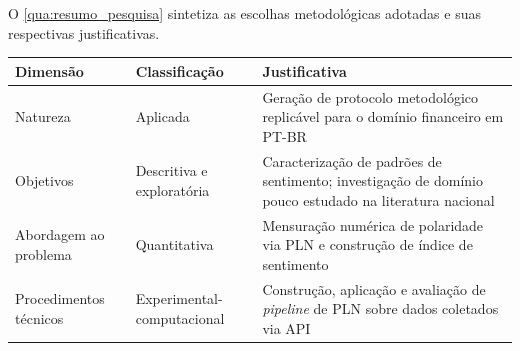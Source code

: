 O \autoref{qua:resumo_pesquisa} sintetiza as escolhas metodológicas adotadas e suas respectivas justificativas.

\begin{quadro}[htb]
	\caption{\label{qua:resumo_pesquisa}Síntese da caracterização metodológica da pesquisa}
	\begin{tabular}{|p{4cm}|p{4cm}|p{6.5cm}|}
		\hline
		\textbf{Dimensão} & \textbf{Classificação} & \textbf{Justificativa} \\
		\hline
		Natureza & Aplicada & Geração de protocolo metodológico replicável para o domínio financeiro em PT-BR \\
		\hline
		Objetivos & Descritiva e exploratória & Caracterização de padrões de sentimento; investigação de domínio pouco estudado na literatura nacional \\
		\hline
		Abordagem ao problema & Quantitativa & Mensuração numérica de polaridade via PLN e construção de índice de sentimento \\
		\hline
		Procedimentos técnicos & Experimental-computacional & Construção, aplicação e avaliação de \textit{pipeline} de PLN sobre dados coletados via API \\
		\hline
	\end{tabular}
\end{quadro}
